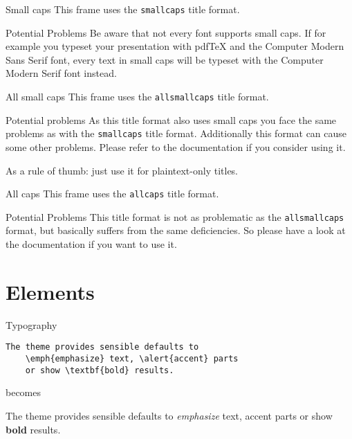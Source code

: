 \documentclass[10pt]{beamer}
\begin{document}
    {
    \begin{frame}{Small caps}
        This frame uses the \texttt{smallcaps} title format.
    
        \begin{alertblock}{Potential Problems}
            Be aware that not every font supports small caps. If for example you typeset your presentation with pdfTeX and the Computer Modern Sans Serif font, every text in small caps will be typeset with the Computer Modern Serif font instead.
        \end{alertblock}
    \end{frame}
    }
    
    {
    \begin{frame}{All small caps}
        This frame uses the \texttt{allsmallcaps} title format.
    
        \begin{alertblock}{Potential problems}
            As this title format also uses small caps you face the same problems as with the \texttt{smallcaps} title format. Additionally this format can cause some other problems. Please refer to the documentation if you consider using it.
    
            As a rule of thumb: just use it for plaintext-only titles.
        \end{alertblock}
    \end{frame}
    }
    
    {
    \begin{frame}{All caps}
        This frame uses the \texttt{allcaps} title format.
    
        \begin{alertblock}{Potential Problems}
            This title format is not as problematic as the \texttt{allsmallcaps} format, but basically suffers from the same deficiencies. So please have a look at the documentation if you want to use it.
        \end{alertblock}
    \end{frame}
    }
    
    \section{Elements}
    
    \begin{frame}[fragile]{Typography}
          \begin{verbatim}The theme provides sensible defaults to
    \emph{emphasize} text, \alert{accent} parts
    or show \textbf{bold} results.\end{verbatim}
    
      \begin{center}becomes\end{center}
    
      The theme provides sensible defaults to \emph{emphasize} text,
      \alert{accent} parts or show \textbf{bold} results.
    \end{frame}
    
\end{document}

